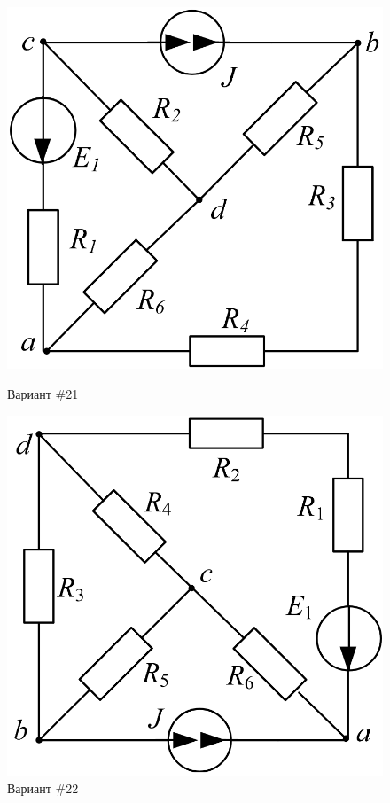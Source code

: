 \begin{figure}[H]
    \centering
    \begin{minipage}{0.48\textwidth}
        \centering
        \includegraphics[width=\textwidth]{images/21_task.png}
        \caption{Вариант \#21}
        \label{fig:task_21}
    \end{minipage}
    \hfill
    \begin{minipage}{0.48\textwidth}
        \centering
        \includegraphics[width=\textwidth]{images/22_task.png}
        \caption{Вариант \#22}
        \label{fig:task_22}
    \end{minipage}
\end{figure}

